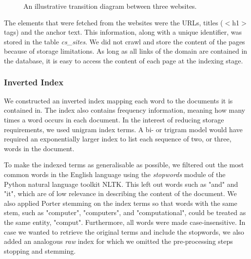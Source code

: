 \begin{figure}[!h]
\centering
\caption{An illustrative transition diagram between three websites.}
\label{fig:graph}
\end{figure}

The elements that were fetched from the websites were the URLs, titles ($<$h1$>$ tags) and the anchor text. This information, along with a unique identifier, was stored in the table \emph{cs\_sites}. We did not crawl and store the content of the pages because of storage limitations. As long as all links of the domain are contained in the database, it is easy to access the content of each page at the indexing stage.


\subsubsection{Inverted Index} %
\label{ssub:inverted_index}

We constructed an inverted index mapping each word to the documents it is contained in. The index also contains frequency information, meaning how many times a word occurs in each document. In the interest of reducing storage requirements, we used unigram index terms. A bi- or trigram model would have required an exponentially larger index to list each sequence of two, or three, words in the document.

To make the indexed terms as generalisable as possible, we filtered out the most common words in the English language using the \emph{stopwords} module of the Python natural language toolkit NLTK. This left out words such as "and" and "it", which are of low relevance in describing the content of the document. We also applied Porter stemming \cite{porter1980algorithm} on the index terms so that words with the same stem, such as "computer", "computers", and "computational", could be treated as the same entity, "comput". Furthermore, all words were made case-insensitive. In case we wanted to retrieve the original terms and include the stopwords, we also added an analogous \emph{raw} index for which we omitted the pre-processing steps stopping and stemming. \\

